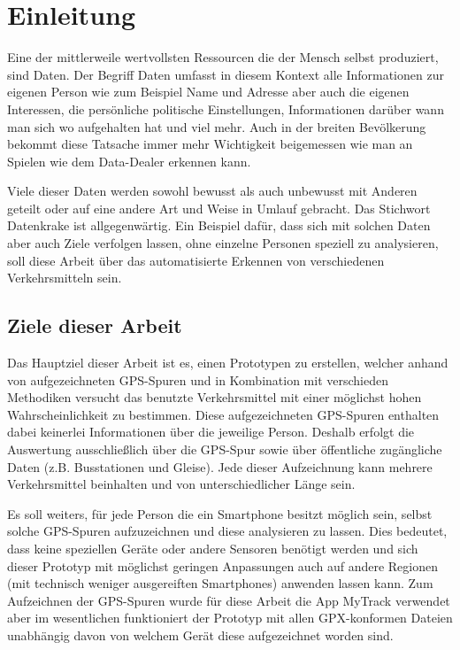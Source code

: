 \chapter{Einleitung}
Eine der mittlerweile wertvollsten Ressourcen die der Mensch selbst produziert, sind Daten. Der Begriff Daten umfasst in diesem Kontext alle Informationen zur eigenen Person wie zum Beispiel Name und Adresse aber auch die eigenen Interessen, die persönliche politische Einstellungen, Informationen darüber wann man sich wo aufgehalten hat und viel mehr. Auch in der breiten Bevölkerung bekommt diese Tatsache immer mehr Wichtigkeit beigemessen wie man an Spielen wie dem Data-Dealer erkennen kann.

Viele dieser Daten werden sowohl  bewusst als auch unbewusst mit Anderen geteilt oder auf eine andere Art und Weise in Umlauf gebracht. Das Stichwort Datenkrake ist allgegenwärtig. Ein Beispiel dafür, dass sich mit solchen Daten aber auch Ziele verfolgen lassen, ohne einzelne Personen speziell zu analysieren, soll diese Arbeit über das automatisierte Erkennen von verschiedenen Verkehrsmitteln sein. \cite{zheng2012}

\section{Ziele dieser Arbeit}
Das Hauptziel dieser Arbeit ist es, einen Prototypen zu erstellen, welcher anhand von aufgezeichneten GPS-Spuren und in Kombination mit verschieden Methodiken versucht das benutzte  Verkehrsmittel mit einer möglichst hohen Wahrscheinlichkeit zu bestimmen. Diese aufgezeichneten GPS-Spuren enthalten dabei keinerlei Informationen über die jeweilige Person. Deshalb erfolgt die Auswertung ausschließlich über die GPS-Spur sowie über öffentliche zugängliche Daten (z.B. Busstationen und Gleise). Jede dieser Aufzeichnung kann mehrere Verkehrsmittel beinhalten und von unterschiedlicher Länge sein.

Es soll weiters, für jede Person die ein Smartphone besitzt möglich sein, selbst solche GPS-Spuren aufzuzeichnen und diese analysieren zu lassen. Dies bedeutet, dass keine speziellen Geräte oder andere Sensoren benötigt werden und sich dieser Prototyp mit möglichst geringen Anpassungen auch auf andere Regionen (mit technisch weniger ausgereiften Smartphones) anwenden lassen kann. Zum Aufzeichnen der GPS-Spuren wurde für diese Arbeit die App MyTrack verwendet aber im wesentlichen funktioniert der Prototyp mit allen GPX-konformen Dateien unabhängig davon von welchem Gerät diese aufgezeichnet worden sind.


